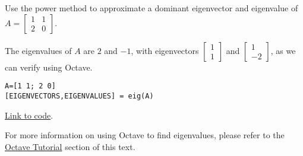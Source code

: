 \documentclass{ximera}
\begin{document}
\begin{exploration}\label{exp:2x2PowerMethod}
Use the power method to approximate a dominant eigenvector and eigenvalue of $A = \left[ \begin{array}{rr}
1 & 1 \\
2 & 0
\end{array}\right]$.

The eigenvalues of $A$ are $2$ and $-1$, with eigenvectors $\left[ \begin{array}{rr}
  1 \\
  1
  \end{array}\right]$ and $\left[ \begin{array}{rr}
  1 \\
  -2
  \end{array}\right]$, as we can verify using Octave. 
  
\begin{verbatim}
A=[1 1; 2 0]
[EIGENVECTORS,EIGENVALUES] = eig(A)
\end{verbatim}

\href{https://sagecell.sagemath.org/?z=eJxztI02VDC0VjBSMIjl5Yp29XR39QtzdQ7xDwrWgXAcfUJdg2MVbBVSM9M1HDUBKv8Mmw==&lang=octave&interacts=eJyLjgUAARUAuQ==}{Link to code}.

For more information on using Octave to find eigenvalues, please refer to the \href{https://ximera.osu.edu/linearalgebradzv3/xOctave}{Octave Tutorial} section of this text.


\end{exploration}
\end{document}
